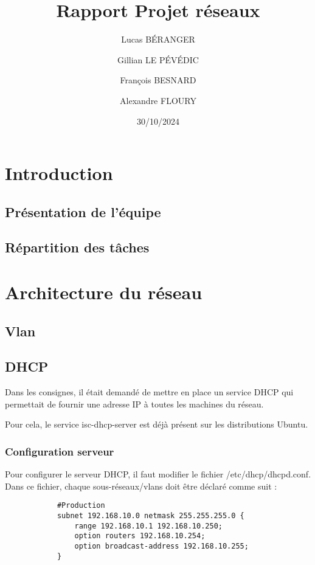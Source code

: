 \documentclass[a4paper,12pt]{report}
\title{Rapport Projet réseaux}
\author{
    Lucas BÉRANGER \and
    Gillian LE PÉVÉDIC \and
    François BESNARD \and
    Alexandre FLOURY \and
}
\date{30/10/2024}
\begin{document}
    \maketitle  
    \newpage

    \tableofcontents
    \newpage

    \chapter{Introduction}
        \section{Présentation de l'équipe}
        \section{Répartition des tâches}


    \chapter{Architecture du réseau}
        \section{Vlan}
        \section{DHCP}
            Dans les consignes, il était demandé de mettre en place un service DHCP qui permettait de fournir une adresse IP à toutes les machines du réseau. 
            
            Pour cela, le service isc-dhcp-server est déjà présent sur les distributions Ubuntu.
            \subsection{Configuration serveur}
            Pour configurer le serveur DHCP, il faut modifier le fichier /etc/dhcp/dhcpd.conf. 
            Dans ce fichier, chaque sous-réseaux/vlans doit être déclaré comme suit :
                
            \begin{verbatim}
            #Production
            subnet 192.168.10.0 netmask 255.255.255.0 {
                range 192.168.10.1 192.168.10.250;
                option routers 192.168.10.254;
                option broadcast-address 192.168.10.255;
            }
            \end{verbatim}
                
\end{document}
